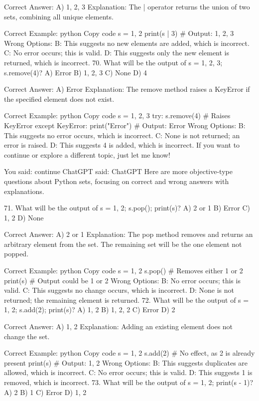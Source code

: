 Correct Answer: A) {1, 2, 3}
Explanation: The | operator returns the union of two sets, combining all unique elements.

Correct Example:
python
Copy code
s = {1, 2}
print(s | {3})  # Output: {1, 2, 3}
Wrong Options:
B: This suggests no new elements are added, which is incorrect.
C: No error occurs; this is valid.
D: This suggests only the new element is returned, which is incorrect.
70. What will be the output of s = {1, 2, 3}; s.remove(4)?
A) Error
B) {1, 2, 3}
C) None
D) {4}

Correct Answer: A) Error
Explanation: The remove method raises a KeyError if the specified element does not exist.

Correct Example:
python
Copy code
s = {1, 2, 3}
try:
    s.remove(4)  # Raises KeyError
except KeyError:
    print("Error")  # Output: Error
Wrong Options:
B: This suggests no error occurs, which is incorrect.
C: None is not returned; an error is raised.
D: This suggests 4 is added, which is incorrect.
If you want to continue or explore a different topic, just let me know!






You said:
continue
ChatGPT said:
ChatGPT
Here are more objective-type questions about Python sets, focusing on correct and wrong answers with explanations.

71. What will be the output of s = {1, 2}; s.pop(); print(s)?
A) {2} or {1}
B) Error
C) {1, 2}
D) None

Correct Answer: A) {2} or {1}
Explanation: The pop method removes and returns an arbitrary element from the set. The remaining set will be the one element not popped.

Correct Example:
python
Copy code
s = {1, 2}
s.pop()  # Removes either 1 or 2
print(s)  # Output could be {1} or {2}
Wrong Options:
B: No error occurs; this is valid.
C: This suggests no change occurs, which is incorrect.
D: None is not returned; the remaining element is returned.
72. What will be the output of s = {1, 2}; s.add(2); print(s)?
A) {1, 2}
B) {1, 2, 2}
C) Error
D) {2}

Correct Answer: A) {1, 2}
Explanation: Adding an existing element does not change the set.

Correct Example:
python
Copy code
s = {1, 2}
s.add(2)  # No effect, as 2 is already present
print(s)  # Output: {1, 2}
Wrong Options:
B: This suggests duplicates are allowed, which is incorrect.
C: No error occurs; this is valid.
D: This suggests 1 is removed, which is incorrect.
73. What will be the output of s = {1, 2}; print(s - {1})?
A) {2}
B) {1}
C) Error
D) {1, 2}


